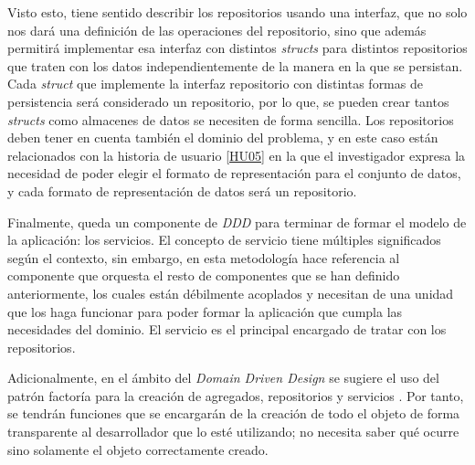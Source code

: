 Visto esto, tiene sentido describir los repositorios usando una interfaz, que no
solo nos dará una definición de las operaciones del repositorio, sino que además
permitirá implementar esa interfaz con distintos \textit{structs} para distintos
repositorios que traten con los datos independientemente de la manera en la que
se persistan. Cada \textit{struct} que implemente la interfaz repositorio con
distintas formas de persistencia será considerado un repositorio, por lo que, se
pueden crear tantos \textit{structs} como almacenes de datos se necesiten de
forma sencilla. Los repositorios deben tener en cuenta también el dominio del
problema, y en este caso están relacionados con la historia de usuario
\href{https://github.com/jlgallego99/TropesToGo/issues/30}{[HU05]} en la que el
investigador expresa la necesidad de poder elegir el formato de representación
para el conjunto de datos, y cada formato de representación de datos será un
repositorio.

Finalmente, queda un componente de \textit{DDD} para terminar de formar el
modelo de la aplicación: los servicios. El concepto de servicio tiene múltiples
significados según el contexto, sin embargo, en esta metodología hace referencia
al componente que orquesta el resto de componentes que se han definido
anteriormente, los cuales están débilmente acoplados y necesitan de una unidad
que los haga funcionar para poder formar la aplicación que cumpla las
necesidades del dominio. El servicio es el principal encargado de tratar con los
repositorios.

Adicionalmente, en el ámbito del \textit{Domain Driven Design} se sugiere el uso
del patrón factoría para la creación de agregados, repositorios y servicios
\cite{ddd_golang}. Por tanto, se tendrán funciones que se encargarán de la
creación de todo el objeto de forma transparente al desarrollador que lo esté
utilizando; no necesita saber qué ocurre sino solamente el objeto correctamente
creado.

